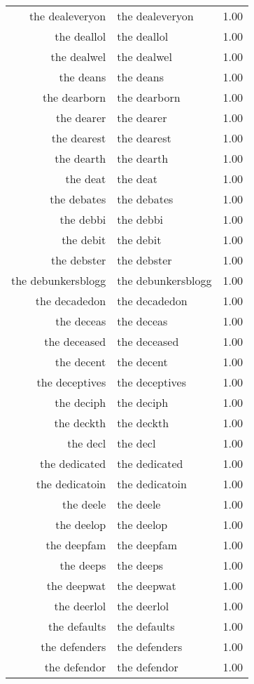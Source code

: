 \begin{table}[ht]
\begin{tabular}{rlr}
  the dealeveryon & the dealeveryon & 1.00 \\ 
  the deallol & the deallol & 1.00 \\ 
  the dealwel & the dealwel & 1.00 \\ 
  the deans & the deans & 1.00 \\ 
  the dearborn & the dearborn & 1.00 \\ 
  the dearer & the dearer & 1.00 \\ 
  the dearest & the dearest & 1.00 \\ 
  the dearth & the dearth & 1.00 \\ 
  the deat & the deat & 1.00 \\ 
  the debates & the debates & 1.00 \\ 
  the debbi & the debbi & 1.00 \\ 
  the debit & the debit & 1.00 \\ 
  the debster & the debster & 1.00 \\ 
  the debunkersblogg & the debunkersblogg & 1.00 \\ 
  the decadedon & the decadedon & 1.00 \\ 
  the deceas & the deceas & 1.00 \\ 
  the deceased & the deceased & 1.00 \\ 
  the decent & the decent & 1.00 \\ 
  the deceptives & the deceptives & 1.00 \\ 
  the deciph & the deciph & 1.00 \\ 
  the deckth & the deckth & 1.00 \\ 
  the decl & the decl & 1.00 \\ 
  the dedicated & the dedicated & 1.00 \\ 
  the dedicatoin & the dedicatoin & 1.00 \\ 
  the deele & the deele & 1.00 \\ 
  the deelop & the deelop & 1.00 \\ 
  the deepfam & the deepfam & 1.00 \\ 
  the deeps & the deeps & 1.00 \\ 
  the deepwat & the deepwat & 1.00 \\ 
  the deerlol & the deerlol & 1.00 \\ 
  the defaults & the defaults & 1.00 \\ 
  the defenders & the defenders & 1.00 \\ 
  the defendor & the defendor & 1.00 \\ 

\end{tabular}
\end{table}
